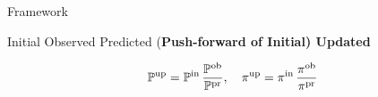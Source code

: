 \begin{block}{Framework}
\large
    \begin{itemize}
        \itembox{$ \initialP, \; \initial $} Initial
        \itembox{$ \observedP, \; \observed $} Observed
        \itembox{$ \predictedP, \; \predicted $} Predicted (\bf{Push-forward of Initial})
        \itembox{$ \updatedP, \; \updated $} Updated
    \end{itemize}
\Large
\begin{equation*}
        \dciP, \quad \dciD
    \end{equation*}

\end{block}


